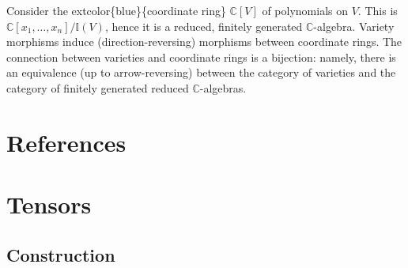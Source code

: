 \documentclass[
]{book}
\begin{document}
Consider the extcolor\{blue\}\{coordinate ring\} \(\mathbb{C}[V]\) of polynomials on \(V\). This is \(\mathbb{C}[x_1, \dots, x_n]/\mathbb{I}(V)\), hence it is a reduced, finitely generated \(\mathbb{C}\)-algebra. Variety morphisms induce (direction-reversing) morphisms between coordinate rings. The connection between varieties and coordinate rings is a bijection: namely, there is an equivalence (up to arrow-reversing) between the category of varieties and the category of finitely generated reduced \(\mathbb{C}\)-algebras.

\hypertarget{references}{%
\chapter*{References}\label{references}}

\cleardoublepage

\hypertarget{appendix-appendix}{%
\appendix}


\hypertarget{tensors}{%
\chapter{Tensors}\label{tensors}}

\hypertarget{construction-5}{%
\section{Construction}\label{construction-5}}
\end{document}
